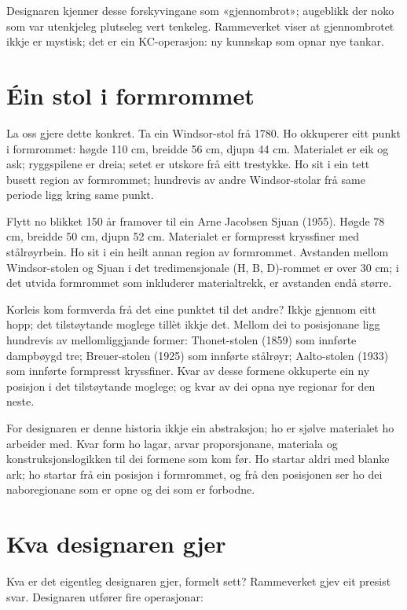Designaren kjenner desse forskyvingane som «gjennombrot»; augeblikk der noko som var utenkjeleg plutseleg vert tenkeleg. Rammeverket viser at gjennombrotet ikkje er mystisk; det er ein KC-operasjon: ny kunnskap som opnar nye tankar.

\section*{Éin stol i formrommet}

La oss gjere dette konkret. Ta ein Windsor-stol frå 1780. Ho okkuperer eitt punkt i formrommet: høgde 110 cm, breidde 56 cm, djupn 44 cm. Materialet er eik og ask; ryggspilene er dreia; setet er utskore frå eitt trestykke. Ho sit i ein tett busett region av formrommet; hundrevis av andre Windsor-stolar frå same periode ligg kring same punkt.

Flytt no blikket 150 år framover til ein Arne Jacobsen Sjuan (1955). Høgde 78 cm, breidde 50 cm, djupn 52 cm. Materialet er formpresst kryssfiner med stålrøyrbein. Ho sit i ein heilt annan region av formrommet. Avstanden mellom Windsor-stolen og Sjuan i det tredimensjonale (H, B, D)-rommet er over 30 cm; i det utvida formrommet som inkluderer materialtrekk, er avstanden endå større.

Korleis kom formverda frå det eine punktet til det andre? Ikkje gjennom eitt hopp; det tilstøytande moglege tillèt ikkje det. Mellom dei to posisjonane ligg hundrevis av mellomliggjande former: Thonet-stolen (1859) som innførte dampbøygd tre; Breuer-stolen (1925) som innførte stålrøyr; Aalto-stolen (1933) som innførte formpresst kryssfiner. Kvar av desse formene okkuperte ein ny posisjon i det tilstøytande moglege; og kvar av dei opna nye regionar for den neste.

For designaren er denne historia ikkje ein abstraksjon; ho er sjølve materialet ho arbeider med. Kvar form ho lagar, arvar proporsjonane, materiala og konstruksjonslogikken til dei formene som kom før. Ho startar aldri med blanke ark; ho startar frå ein posisjon i formrommet, og frå den posisjonen ser ho dei naboregionane som er opne og dei som er forbodne.

\section*{Kva designaren gjer}

Kva er det eigentleg designaren gjer, formelt sett? Rammeverket gjev eit presist svar. Designaren utfører fire operasjonar:

